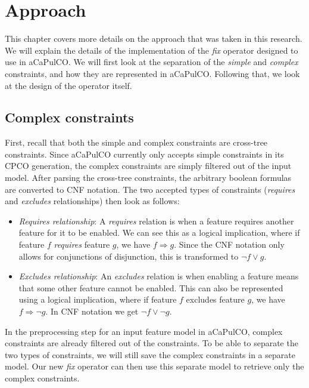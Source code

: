\chapter{Approach}\label{ch:approach}
This chapter covers more details on the approach that was taken in this research.
We will explain the details of the implementation of the \emph{fix} operator
designed to use in aCaPulCO. We will first look at the separation of the 
\emph{simple} and \emph{complex} constraints, and how they are represented in
aCaPulCO. Following that, we look at the design of the operator itself.

\section{Complex constraints}
First, recall that both the simple and complex constraints are cross-tree
constraints. Since aCaPulCO currently only accepts simple constraints in its
CPCO generation, the complex constraints are simply filtered out of the input
model. After parsing the cross-tree constraints, the arbitrary boolean formulas
are converted to CNF notation. The two accepted types of constraints 
(\emph{requires} and \emph{excludes} relationships) then look as follows:

\begin{itemize}
    \item \textit{Requires relationship}: A \emph{requires} relation is when a
          feature requires another feature for it to be enabled. We can see this
          as a logical implication, where if feature $f$ \emph{requires} feature 
          $g$, we have \( f \Rightarrow g \). Since the CNF notation only allows
          for conjunctions of disjunction, this is transformed to \( \neg f \lor g \).
    \item \textit{Excludes relationship}: An \emph{excludes} relation is when
          enabling a feature means that some other feature cannot be enabled. This
          can also be represented using a logical implication, where if feature $f$
          excludes feature $g$, we have \( f \Rightarrow \neg g \). In CNF notation
          we get \( \neg f \lor \neg g \).
\end{itemize}

In the preprocessing step for an input feature model in aCaPulCO, complex
constraints are already filtered out of the constraints. To be able to separate
the two types of constraints, we will still save the complex constraints in a
separate model. Our new \emph{fix} operator can then use this separate model to
retrieve only the complex constraints.

